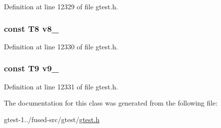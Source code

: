 \-Definition at line 12329 of file gtest.\-h.

\hypertarget{classtesting_1_1internal_1_1ValueArray38_a596bc5260b2474271d1f6910ff6f665d}{
\subsubsection[{v8\-\_\-}]{\setlength{\rightskip}{0pt plus 5cm}const \-T8 {\bf v8\-\_\-}}}\label{d5/d7a/classtesting_1_1internal_1_1ValueArray38_a596bc5260b2474271d1f6910ff6f665d}


\-Definition at line 12330 of file gtest.\-h.

\hypertarget{classtesting_1_1internal_1_1ValueArray38_a6356e16cf54a9dfac8525f20242af31e}{
\subsubsection[{v9\-\_\-}]{\setlength{\rightskip}{0pt plus 5cm}const \-T9 {\bf v9\-\_\-}}}\label{d5/d7a/classtesting_1_1internal_1_1ValueArray38_a6356e16cf54a9dfac8525f20242af31e}


\-Definition at line 12331 of file gtest.\-h.



\-The documentation for this class was generated from the following file\-:\begin{DoxyCompactItemize}
\item 
gtest-\/1../fused-\/src/gtest/\hyperlink{fused-src_2gtest_2gtest_8h}{gtest.\-h}\end{DoxyCompactItemize}
